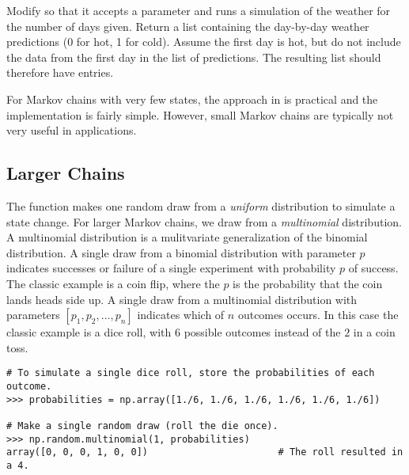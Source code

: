 \begin{problem} %
Modify  so that it accepts a parameter  and runs a simulation of the weather for the number of days given.
Return a list containing the day-by-day weather predictions (0 for hot, 1 for cold).
Assume the first day is hot, but do not include the data from the first day in the list of predictions.
The resulting list should therefore have  entries.
\end{problem}

For Markov chains with very few states, the approach in  is practical and the implementation is fairly simple.
However, small Markov chains are typically not very useful in applications.

\subsection*{Larger Chains} %

The  function makes one random draw from a \emph{uniform} distribution to simulate a state change.
For larger Markov chains, we draw from a \emph{multinomial} distribution.
A multinomial distribution is a mulitvariate generalization of the binomial distribution.
A single draw from a binomial distribution with parameter $p$ indicates successes or failure of a single experiment with probability $p$ of success.
The classic example is a coin flip, where the $p$ is the probability that the coin lands heads side up.
A single draw from a multinomial distribution with parameters $\left[p_1, p_2, ..., p_n \right]$ indicates which of $n$ outcomes occurs.
In this case the classic example is a dice roll, with $6$ possible outcomes instead of the $2$ in a coin toss.

\begin{lstlisting}
# To simulate a single dice roll, store the probabilities of each outcome.
>>> probabilities = np.array([1./6, 1./6, 1./6, 1./6, 1./6, 1./6])

# Make a single random draw (roll the die once).
>>> np.random.multinomial(1, probabilities)         
array([0, 0, 0, 1, 0, 0])                       # The roll resulted in a 4.
\end{lstlisting}

